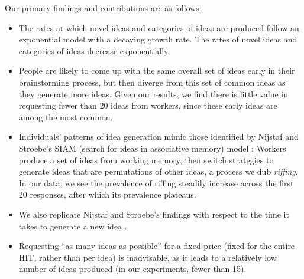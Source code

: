 Our primary findings and contributions are as follows:
\begin{itemize}
\item The rates at which novel ideas and categories of ideas are produced follow an exponential model with a decaying growth rate. The rates of novel ideas and categories of ideas decrease exponentially.
\item People are likely to come up with the same overall set of ideas early in their brainstorming process, but then diverge from this set of common ideas as they generate more ideas. Given our results, we find there is little value in requesting fewer than 20 ideas from workers, since these early ideas are among the most common.
\item Individuals' patterns of idea generation mimic those identified by Nijstaf and Stroebe's SIAM (search for ideas in associative memory) model \cite{nijstad_how_2006}: Workers produce a set of ideas from working memory, then switch strategies to generate ideas that are permutations of other ideas, a process we dub {\em riffing\/}. In our data, we see the prevalence of riffing steadily increase across the first 20 responses, after which its prevalence plateaus.
\item We also replicate Nijstaf and Stroebe's findings with respect to the time it takes to generate a new idea \cite{nijstad_how_2006}.
\item Requesting ``as many ideas as possible'' for a fixed price (fixed for the entire HIT, rather than per idea) is inadvisable, as it leads to a relatively low number of ideas produced (in our experiments, fewer than 15).
\end{itemize}

